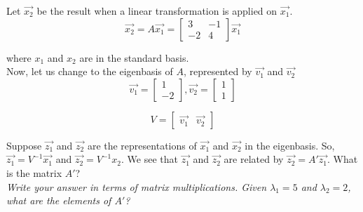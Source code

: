 \begin{enumerate}
  \bigskip

  \qitem Let $\vec{x_2}$ be the result when a linear transformation is applied on $\vec{x_1}$.
  $$\vec{x_2} = A \vec{x_1} =
  \begin{bmatrix}
    3 & -1 \\
    -2 & 4
  \end{bmatrix}
  \vec{x_1}
  $$

  where $x_1$ and $x_2$ are in the standard basis. \\
  Now, let us change to the eigenbasis of $A$, represented by $\vec{v_1}$ and $\vec{v_2}$
  $$
  \vec{v_1} =
  \begin{bmatrix}
    1 \\
    -2
  \end{bmatrix},
  \vec{v_2} =
  \begin{bmatrix}
    1 \\
    1
  \end{bmatrix}
  $$

  $$ V =
  \begin{bmatrix}
    \vec{v_1} & \vec{v_2}
  \end{bmatrix}
  $$

  Suppose $\vec{z_1}$ and $\vec{z_2}$ are the representations of $\vec{x_1}$ and $\vec{x_2}$ in the eigenbasis.
  So, $\vec{z_1} = V^{-1}\vec{x_1}$ and $\vec{z_2} = V^{-1}x_2$.
  We see that $\vec{z_1}$ and $\vec{z_2}$ are related by $\vec{z_2} = A'\vec{z_1}$.
  What is the matrix $A'$? \\
  \textit{
    Write your answer in terms of matrix multiplications.
    Given $\lambda_1 = 5$ and $\lambda_2 = 2$, what are the elements of $A'$?
  } \\


\end{enumerate}
